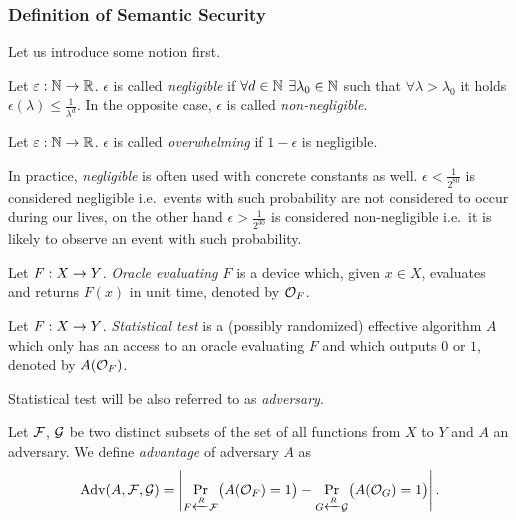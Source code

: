 \subsubsection{Definition of Semantic Security}

Let us introduce some notion first.

\begin{defn}
\label{def:neglfunc}
	Let $\varepsilon:\mathbb{N}\rightarrow\mathbb{R}$. $\epsilon$ is called {\em negligible} if $\forall d\in\mathbb{N}$ $\exists \lambda_0\in\mathbb{N}$ such that $\forall \lambda>\lambda_0$ it holds $\epsilon(\lambda)\leq\frac{1}{\lambda^d}$. In the opposite case, $\epsilon$ is called {\em non-negligible}.
\end{defn}

\begin{defn}
\label{def:overwh}
	Let $\varepsilon:\mathbb{N}\rightarrow\mathbb{R}$. $\epsilon$ is called {\em overwhelming} if $1-\epsilon$ is negligible.
\end{defn}

\begin{note}
\label{note:neglconst}
	In practice, {\em negligible} is often used with concrete constants as well. $\epsilon<\frac{1}{2^{80}}$ is considered negligible i.e.\ events with such probability are not considered to occur during our lives, on the other hand $\epsilon>\frac{1}{2^{30}}$ is considered non-negligible i.e.\ it is likely to observe an event with such probability.
\end{note}

\begin{defn}[Oracle]
\label{def:oracle}
	Let $F:X\rightarrow Y$. {\em Oracle evaluating $F$} is a device which, given $x\in X$, evaluates and returns $F(x)$ in unit time, denoted by ${\cal O}_F$.
\end{defn}

\begin{defn}
\label{def:stattest}
	Let $F:X\rightarrow Y$. {\em Statistical test} is a (possibly randomized) effective algorithm $A$ which only has an access to an oracle evaluating $F$ and which outputs $0$ or $1$, denoted by $A({\cal O}_F)$.
\end{defn}

\begin{note}
	Statistical test will be also referred to as {\em adversary}.
\end{note}

\begin{defn}[Advantage]
\label{def:advant}
	Let $\cal F$, $\cal G$ be two distinct subsets of the set of all functions from $X$ to $Y$ and $A$ an adversary. We define {\em advantage} of adversary $A$ as
	\[
		\operatorname*{Adv}(A,{\cal F},{\cal G}) = \left| \Pr\limits_{F\xleftarrow{R} {\cal F}}\bigl(A({\cal O}_F)=1\bigr) - \Pr\limits_{G\xleftarrow{R} {\cal G}}\bigl(A({\cal O}_G)=1\bigr) \right| .
	\]
\end{defn}


